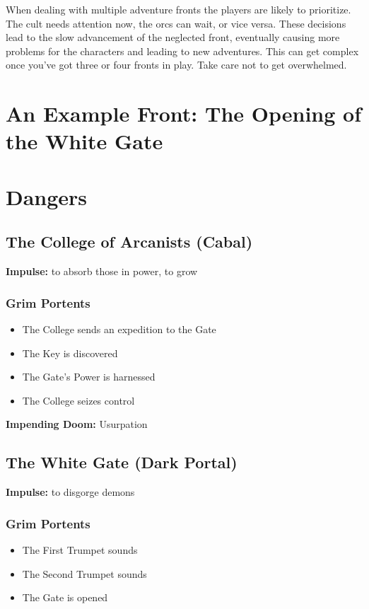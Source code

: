 When dealing with multiple adventure fronts the players are likely to prioritize. The cult needs attention now, the orcs can wait, or vice versa. These decisions lead to the slow advancement of the neglected front, eventually causing more problems for the characters and leading to new adventures. This can get complex once you've got three or four fronts in play. Take care not to get overwhelmed.
\section*{An Example Front: The Opening of the White Gate}
\section*{Dangers}
\subsection{The College of Arcanists (Cabal)}


\textbf{Impulse:}
to absorb those in power, to grow
\subsubsection{Grim Portents}
\begin{itemize}
\item The College sends an expedition to the Gate
\item The Key is discovered
\item The Gate's Power is harnessed
\item The College seizes control

\end{itemize}


\textbf{Impending Doom:}
Usurpation
\subsection{The White Gate (Dark Portal)}


\textbf{Impulse:}
to disgorge demons
\subsubsection{Grim Portents}
\begin{itemize}
\item The First Trumpet sounds
\item The Second Trumpet sounds
\item The Gate is opened

\end{itemize}


